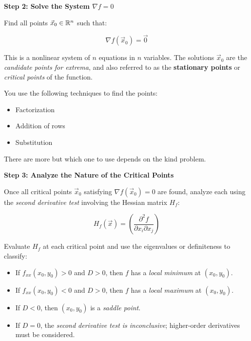 \textbf{Step 2: Solve the System \( \nabla f = 0 \)}

Find all points \( \vec{x}_0 \in \mathbb{R}^n \) such that:

\[
    \nabla f(\vec{x}_0) = \vec{0}
\]

This is a nonlinear system of \( n \) equations in \( n \) variables. The solutions \( \vec{x}_0 \) 
are the \emph{candidate points for extrema}, and also referred to as the 
\textbf{stationary points} or \emph{critical points} of the function.
\vspace{\baselineskip}

You use the following techniques to find the points: 

\begin{itemize}

    \item Factorization

    \item Addition of rows

    \item Substitution

\end{itemize}

There are more but which one to use depends on the kind problem.
\vspace{\baselineskip}

\textbf{Step 3: Analyze the Nature of the Critical Points}

Once all critical points \( \vec{x}_0 \) satisfying \( \nabla f(\vec{x}_0) = 0 \) are found, analyze each using
 the \emph{second derivative test} involving the Hessian matrix \( H_f \):

\[
    H_f(\vec{x}) = \left( \frac{\partial^2 f}{\partial x_i \partial x_j} \right)
\]

Evaluate \( H_f \) at each critical point and use the eigenvalues or definiteness to classify:

\begin{itemize}

    \item If \( f_{xx}(x_0, y_0) > 0 \) and \( D > 0 \), then \( f \) has a \emph{local minimum} at \( (x_0, y_0) \).

    \item If \( f_{xx}(x_0, y_0) < 0 \) and \( D > 0 \), then \( f \) has a \emph{local maximum} at \( (x_0, y_0) \).

    \item If \( D < 0 \), then \( (x_0, y_0) \) is a \emph{saddle point}.

    \item If \( D = 0 \), the \emph{second derivative test is inconclusive}; higher-order derivatives must be considered.

\end{itemize}

